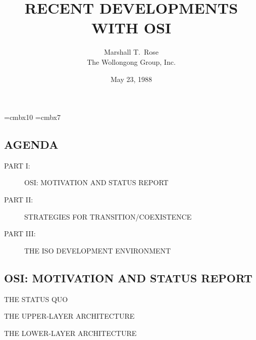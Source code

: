 

\font\xx=cmbx10
\font\yy=cmbx7

\raggedright


\let\tradeNAMfont=\relax
\let\tradeORGfont=\relax



\title	{RECENT DEVELOPMENTS WITH OSI}
\author	{Marshall T.~Rose\\ The Wollongong Group, Inc.}
\date	{May 23, 1988}
\maketitlepage


\begin{bwslide}
\part*	{AGENDA}\bf

\begin{description}
\item[PART I:]		OSI: MOTIVATION AND STATUS REPORT

\item[PART II:]		STRATEGIES FOR TRANSITION/COEXISTENCE 

\item[PART III:]	THE ISO DEVELOPMENT ENVIRONMENT
\end{description}
\end{bwslide}


\begin{bwslide}
\part	{OSI: MOTIVATION AND STATUS REPORT}

\begin{nrtc}
\item	THE STATUS QUO

\item	THE UPPER-LAYER ARCHITECTURE

\item	THE LOWER-LAYER ARCHITECTURE
\end{nrtc}
\end{bwslide}


